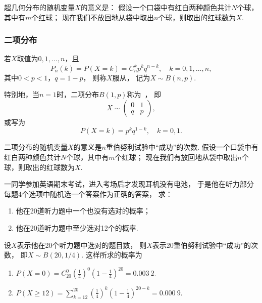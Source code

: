 超几何分布的随机变量\(X\)的意义是：
假设一个口袋中有红白两种颜色共计\(N\)个球，其中有\(m\)个红球；
现在我们不放回地从袋中取出\(n\)个球，则取出的红球数为\(X\).

\subsubsection{二项分布}
\begin{definition}
若\(X\)取值为\(0,1,\dotsc,n\)，且\begin{equation}
P_n(k) = P(X=k) = C_n^k p^k q^{n-k}, \quad k=0,1,\dotsc,n,
\end{equation}其中\(0 < p < 1\)，\(q = 1-p\)，
则称\(X\)服从，
记为\(X \sim B(n,p)\).

特别地，当\(n = 1\)时，二项分布\(B(1,p)\)称为~，
即\[
	X \sim \begin{pmatrix} 0 & 1 \\ q & p \end{pmatrix},
\]
或写为\[
	P(X=k) = p^k q^{1-k}, \quad k=0,1.
\]
\end{definition}

二项分布的随机变量\(X\)的意义是\(n\)重伯努利试验中“成功”的次数.
假设一个口袋中有红白两种颜色共计\(N\)个球，其中有\(m\)个红球；
现在我们有放回地从袋中取出\(n\)个球，则取出的红球数为\(X\).

\begin{example}
一同学参加英语期末考试，进入考场后才发现耳机没有电池，
于是他在听力部分每题4个选项中随机选一个答案作为正确的答案，
求：\begin{enumerate}
	\item 他在20道听力题中一个也没有选对的概率；
	\item 他在20道听力题中至少选对12个的概率.
\end{enumerate}
\begin{solution}
设\(X\)表示他在20个听力题中选对的题目数，
则\(X\)表示20重伯努利试验中“成功”的次数，
即\(X \sim B(20, 1/4)\).
这样所求的概率为\begin{enumerate}
	\item \(P(X=0) = C_{20}^0 \left(\frac14\right)^0 \left(1-\frac14\right)^{20} = 0.003\ 2\).
	\item \(P(X \geq 12) = \sum_{k=12}^{20} \left(\frac14\right)^k \left(1-\frac14\right)^{20-k} = 0.000\ 9\).
\end{enumerate}
\end{solution}
\end{example}


